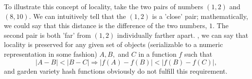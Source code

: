 \documentclass[12pt]{article}
\begin{document}
\par To illustrate this concept of locality, take the two pairs of numbers $(1,2)$ and $(8,10)$. We can intuitively tell that the $(1,2)$ is a 'close' pair; mathematically, we could say that this distance is the difference of the two numbers, $1$. The second pair is both 'far' from $(1,2)$ individually farther apart. , we can say that locality is preserved for any given set of objects (serializable to a numeric representation in some fashion) $A,B,$ and $C$ in a function $f$ such that
\begin{equation}
|A-B| < |B-C| \Rightarrow |f(A)-f(B)| < |f(B) - f(C)|,
\end{equation}
and garden variety hash functions obviously do not fulfill this requirement.

\printbibliography
\end{document}
